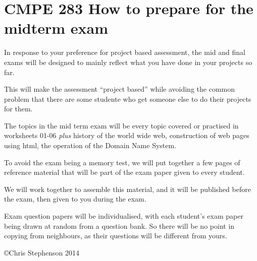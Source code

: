 \documentclass[12pt, a4paper]{article}
\begin{document}

\section*{CMPE 283 How to prepare for the midterm exam}

In response to your  preference for project based assessment, the mid and final exams will be designed to mainly reflect what you have done in your projects so far. 

This will make the assessment ``project based'' while avoiding the common problem that there are some studente who get someone else to do their projects for them. 

The topics in the mid term exam will be every topic covered or practised in worksheets 01-06 \emph{plus} history of the world wide web, construction of web pages using html, the operation of the Domain Name System.

To avoid the exam being a memory test, we will put together a few pages of reference material that will be part of the exam paper given to every student.

We will work together to assemble this material, and it will be published before the exam, then given to you during the exam.

Exam question papers will be individualised, with each student's exam paper being drawn at random from a question bank. So there will be no point in copying from neighbours, as their questions will be different from yours.

\copyright Chris Stephenson 2014
\end{document}

